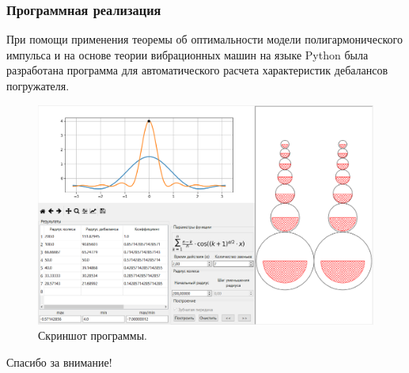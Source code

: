 \documentclass[10pt, pdf, hyperref={unicode}]{beamer}
\begin{document}
    \begin{frame}
        \frametitle{Программная реализация}
        \begin{center}
            \begin{minipage}[h]{0.97\linewidth}
                При помощи применения теоремы об оптимальности модели полигармонического импульса и на основе теории вибрационных машин
                на языке Python была разработана программа для автоматического расчета характеристик дебалансов погружателя.
                \begin{figure}[h]
                    \centering
                    \includegraphics[width=0.62\linewidth]{../img/xolm_2.png}
                    \caption{Скриншот программы.}
                \end{figure}
            \end{minipage}
        \end{center}
    \end{frame}


    \begin{frame}
        \begin{alertblock}{}
            \centerline{\large Спасибо за внимание!}
        \end{alertblock}
    \end{frame}
\end{document}

